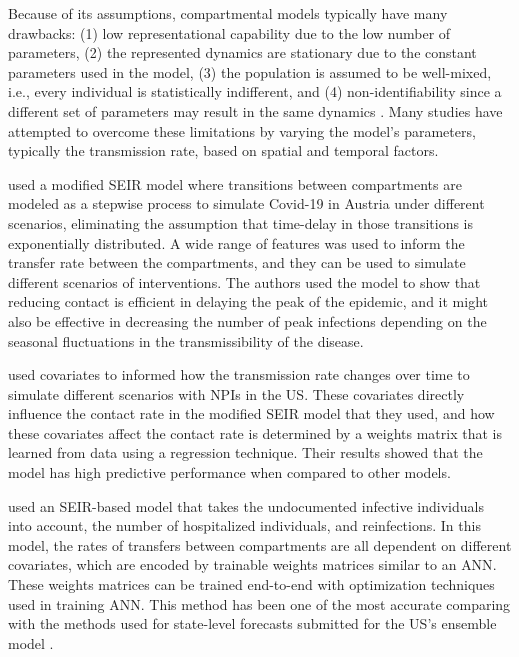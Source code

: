 Because of its assumptions, compartmental models typically have many drawbacks: (1) low representational capability due to the low number of parameters, (2) the represented dynamics are stationary due to the constant parameters used in the model, (3) the population is assumed to be well-mixed, i.e., every individual is statistically indifferent, and (4) non-identifiability since a different set of parameters may result in the same dynamics \cite{roosaAssessingParameterIdentifiability2019}.
Many studies have attempted to overcome these limitations by varying the model's parameters, typically the transmission rate, based on spatial and temporal factors.

\citeauthor{schneiderCOVID19PandemicPreparedness2020} \cite{schneiderCOVID19PandemicPreparedness2020} used a modified \gls{SEIR} model where transitions between compartments are modeled as a stepwise process to simulate Covid-19 in Austria under different scenarios, eliminating the assumption that time-delay in those transitions is exponentially distributed.
A wide range of features was used to inform the transfer rate between the compartments, and they can be used to simulate different scenarios of interventions.
The authors used the model to show that reducing contact is efficient in delaying the peak of the epidemic, and it might also be effective in decreasing the number of peak infections depending on the seasonal fluctuations in the transmissibility of the disease.

\citeauthor{ihmecovid-19forecastingteamModelingCOVID19Scenarios2021} \cite{ihmecovid-19forecastingteamModelingCOVID19Scenarios2021} used covariates to informed how the transmission rate changes over time to simulate different scenarios with \glspl{NPI} in the \gls{US}.
These covariates directly influence the contact rate in the modified \gls{SEIR} model that they used, and how these covariates affect the contact rate is determined by a weights matrix that is learned from data using a regression technique.
Their results showed that the model has high predictive performance when compared to other models.

\citeauthor{arikInterpretableSequenceLearning} \cite{arikInterpretableSequenceLearning} used an \gls{SEIR}-based model that takes the undocumented infective individuals into account, the number of hospitalized individuals, and reinfections.
In this model, the rates of transfers between compartments are all dependent on different covariates, which are encoded by trainable weights matrices similar to an \gls{ANN}.
These weights matrices can be trained end-to-end with optimization techniques used in training \gls{ANN}.
This method has been one of the most accurate comparing with the methods used for state-level forecasts submitted for the US’s ensemble model \cite{rayEnsembleForecastsCoronavirus2020}.

